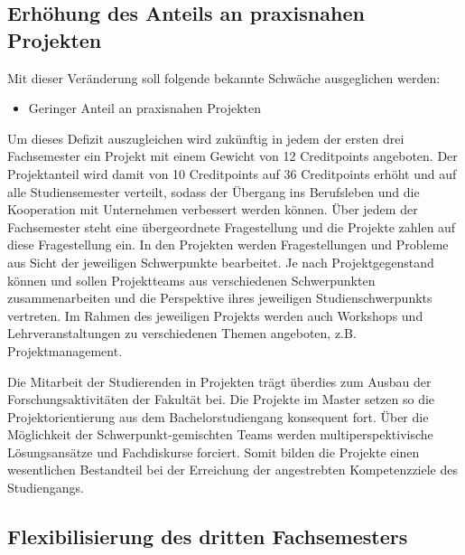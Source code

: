 \subsection{Erhöhung des Anteils an praxisnahen
Projekten\label{/mi-2017/selbstbericht/0150-soll-zustand-geplante-veraenderungen/0000-geplante-veraenderungen-bachelor}}\label{erhuxf6hung-des-anteils-an-praxisnahen-projektenpathlabelmi-2017selbstbericht0150-soll-zustand-geplante-veraenderungen0000-geplante-veraenderungen-bachelor}

Mit dieser Veränderung soll folgende bekannte Schwäche ausgeglichen
werden:

\begin{itemize}
\tightlist
\item
  Geringer Anteil an praxisnahen Projekten
\end{itemize}

Um dieses Defizit auszugleichen wird zukünftig in jedem der ersten drei
Fachsemester ein Projekt mit einem Gewicht von 12 Creditpoints
angeboten. Der Projektanteil wird damit von 10 Creditpoints auf 36
Creditpoints erhöht und auf alle Studiensemester verteilt, sodass der
Übergang ins Berufsleben und die Kooperation mit Unternehmen verbessert
werden können. Über jedem der Fachsemester steht eine übergeordnete
Fragestellung und die Projekte zahlen auf diese Fragestellung ein. In
den Projekten werden Fragestellungen und Probleme aus Sicht der
jeweiligen Schwerpunkte bearbeitet. Je nach Projektgegenstand können und
sollen Projektteams aus verschiedenen Schwerpunkten zusammenarbeiten und
die Perspektive ihres jeweiligen Studienschwerpunkts vertreten. Im
Rahmen des jeweiligen Projekts werden auch Workshops und
Lehrveranstaltungen zu verschiedenen Themen angeboten, z.B.
Projektmanagement.

Die Mitarbeit der Studierenden in Projekten trägt überdies zum Ausbau
der Forschungsaktivitäten der Fakultät bei. Die Projekte im Master
setzen so die Projektorientierung aus dem Bachelorstudiengang konsequent
fort. Über die Möglichkeit der Schwerpunkt-gemischten Teams werden
multiperspektivische Lösungsansätze und Fachdiskurse forciert. Somit
bilden die Projekte einen wesentlichen Bestandteil bei der Erreichung
der angestrebten Kompetenzziele des Studiengangs.

\subsection{Flexibilisierung des dritten
Fachsemesters\label{/mi-2017/selbstbericht/0150-soll-zustand-geplante-veraenderungen/0000-geplante-veraenderungen-bachelor}}\label{flexibilisierung-des-dritten-fachsemesterspathlabelmi-2017selbstbericht0150-soll-zustand-geplante-veraenderungen0000-geplante-veraenderungen-bachelor}

